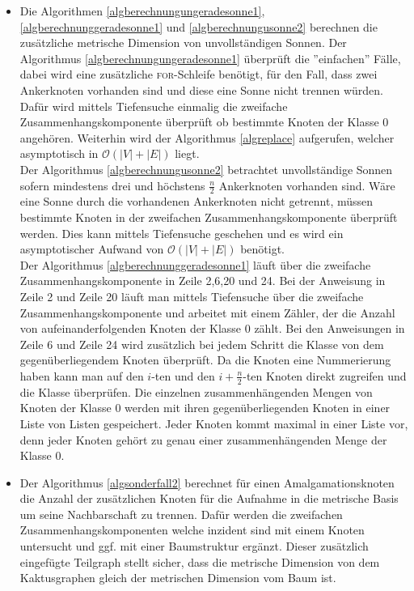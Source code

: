 \begin{bem}
\begin{itemize}
\item Die Algorithmen \ref{algberechnungungeradesonne1}, \ref{algberechnunggeradesonne1} und \ref{algberechnungusonne2} berechnen die zusätzliche metrische Dimension von unvollständigen Sonnen. Der Algorithmus \ref{algberechnungungeradesonne1} überprüft die ''einfachen'' Fälle, dabei wird eine zusätzliche \textsc{for}-Schleife benötigt, für den Fall, dass zwei Ankerknoten vorhanden sind und diese eine Sonne nicht trennen würden. Dafür wird mittels Tiefensuche einmalig die zweifache Zusammenhangskomponente überprüft ob bestimmte Knoten der Klasse $0$ angehören. Weiterhin wird der Algorithmus \ref{algreplace} aufgerufen, welcher asymptotisch in $\mathcal{O}(|V|+|E|)$ liegt.\\
Der Algorithmus \ref{algberechnungusonne2} betrachtet unvollständige Sonnen sofern mindestens drei und höchstens $\frac{n}{2}$ Ankerknoten vorhanden sind. Wäre eine Sonne durch die vorhandenen Ankerknoten nicht getrennt, müssen bestimmte Knoten in der zweifachen Zusammenhangskomponente überprüft werden. Dies kann mittels Tiefensuche geschehen und es wird ein asymptotischer Aufwand von $\mathcal{O}(|V|+|E|)$ benötigt.\\
Der Algorithmus \ref{algberechnunggeradesonne1} läuft über die zweifache Zusammenhangskomponente in Zeile 2,6,20 und 24. Bei der Anweisung in Zeile 2 und Zeile 20 läuft man mittels Tiefensuche über die zweifache Zusammenhangskomponente und arbeitet mit einem Zähler, der die Anzahl von aufeinanderfolgenden Knoten der Klasse $0$ zählt. Bei den Anweisungen in Zeile 6 und Zeile 24 wird zusätzlich bei jedem Schritt die Klasse von dem gegenüberliegendem Knoten überprüft. Da die Knoten eine Nummerierung haben kann man auf den $i$-ten und den $i+\frac{n}{2}$-ten Knoten direkt zugreifen und die Klasse überprüfen. Die einzelnen zusammenhängenden Mengen von Knoten der Klasse $0$ werden mit ihren gegenüberliegenden Knoten in einer Liste von Listen gespeichert. Jeder Knoten kommt maximal in einer Liste vor, denn jeder Knoten gehört zu genau einer zusammenhängenden Menge der Klasse $0$.
\item Der Algorithmus \ref{algsonderfall2} berechnet für einen Amalgamationsknoten die Anzahl der zusätzlichen Knoten für die Aufnahme in die metrische Basis um seine Nachbarschaft zu trennen. Dafür werden die zweifachen Zusammenhangskomponenten welche inzident sind mit einem Knoten untersucht und ggf. mit einer Baumstruktur ergänzt. Dieser zusätzlich eingefügte Teilgraph stellt sicher, dass die metrische Dimension von dem Kaktusgraphen gleich der metrischen Dimension vom Baum ist.\\

\end{itemize}
\end{bem}
